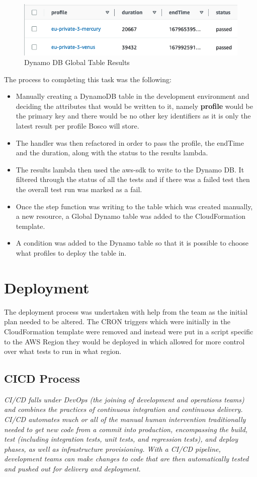 \documentclass[12pt,a4paper,titlepage]{report}
\begin{document}
\begin{figure}[ht]
  \centering
  \includegraphics[width=15cm]{./diagrams/dynamodb.png}
  \caption{Dynamo DB Global Table Results}
 \end{figure}

The process to completing this task was the following:
\begin{itemize}
\item Manually creating a DynamoDB table in the development environment and deciding the attributes that would be written to it, namely \textbf{profile} would be the primary key and there would be no other key identifiers as it is only the latest result per profile Bosco will store.
\item The handler was then refactored in order to pass the profile, the endTime and the duration, along with the status to the results lambda. 
\item The results lambda then used the aws-sdk to write to the Dynamo DB. It filtered through the status of all the tests and if there was a failed test then the overall test run was marked as a fail.
\item Once the step function was writing to the table which was created manually, a new resource, a Global Dynamo table was added to the  CloudFormation template.
\item A condition was added to the Dynamo table so that it is possible to choose what profiles to deploy the table in.
\end{itemize}

\chapter{Deployment}
The deployment process was undertaken with help from the team as the initial plan needed to be altered. 
The CRON triggers which were initially in the CloudFormation template were removed and instead were put in a script specific to the AWS Region they would be deployed in which allowed for more control over what tests to run in what region. 

\section{CICD Process}
\textit{CI/CD falls under DevOps (the joining of development and operations teams) and combines the practices of continuous integration and continuous delivery. CI/CD automates much or all of the manual human intervention traditionally needed to get new code from a commit into production, encompassing the build, test (including integration tests, unit tests, and regression tests), and deploy phases, as well as infrastructure provisioning. With a CI/CD pipeline, development teams can make changes to code that are then automatically tested and pushed out for delivery and deployment.}\autocite{CICD}
\end{document}
